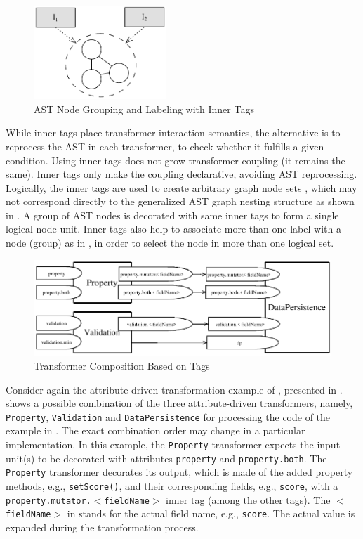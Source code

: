 \begin{figure}[ht]
		\centering
		\includegraphics[width=5cm,height=!]{ch04/it-node}
	\caption{AST Node Grouping and Labeling with Inner Tags}
	\label{fig:it-node}
\end{figure}

While inner tags place transformer interaction semantics, the alternative is to reprocess the AST in each transformer, to check whether it fulfills a given condition. Using inner tags does not grow transformer coupling (it remains the same). Inner tags only make the coupling declarative, avoiding AST reprocessing. Logically, the inner tags are used to create arbitrary graph node sets \cite{mens.99}, which may not correspond directly to the generalized AST graph nesting structure as shown in . A group of AST nodes is decorated with same inner tags to form a single logical node unit. Inner tags also help to associate more than one label with a node (group) as in , in order to select the node in more than one logical set.

\begin{figure}[ht]
		\centering
		\includegraphics[width=12cm,height=!]{ch04/tcomp}
	\caption{Transformer Composition Based on Tags}
	\label{fig:tcomp}
\end{figure}

Consider again the attribute-driven transformation example of , presented in .
 shows a possible combination of the three attribute-driven transformers, namely, \texttt{Pro\-per\-ty}, \texttt{Va\-li\-da\-tion} and \texttt{Da\-ta\-Per\-si\-ste\-nce} for processing the code of the example in . The exact combination order may change in a particular implementation.  In this example, the \texttt{Pro\-per\-ty} transformer  expects the input unit(s) to be decorated with attributes \texttt{property} and \texttt{property.both}. The \texttt{Pro\-per\-ty} transformer decorates its output, which is made of the added property methods, e.g., \texttt{set\-Sco\-re()}, and their corresponding fields, e.g., \texttt{score}, with a \texttt{pro\-per\-ty.mu\-ta\-tor.$<$field\-Na\-me$>$} inner tag (among the other tags). The \texttt{$<$field\-Na\-me$>$} in   stands for the actual field name, e.g., \texttt{score}. The actual value is expanded during the transformation process.

